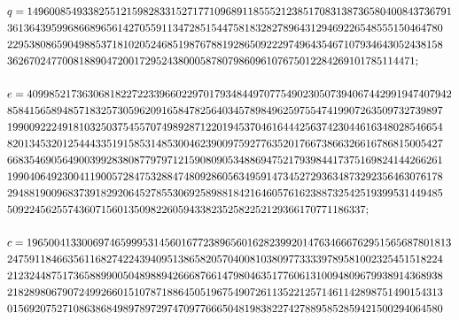 \documentclass{article}
\theoremstyle{break}
\begin{document}
\begin{enumerate}
\[\begin{aligned}
                        &q=14960085493382551215982833152717710968911855521238517083138736580400843736791\\
                        &3613643959968668965614270559113472851544758183282789643129469226548555150464780\\
                        &2295380865904988537181020524685198767881928650922297496435467107934643052438158\\
                        &36267024770081889047200172952438000587807986096107675012284269101785114471;\\
                        \leavevmode\\
                        &e=40998521736306818227223396602297017934844970775490230507394067442991947407942\\
                        &8584156589485718325730596209165847825640345789849625975547419907263509732739897\\
                        &1990092224918103250375455707498928712201945370461644425637423044616348028546654\\
                        &8201345320125444335191585314853004623900975927763520176673866326616786815005427\\
                        &6683546905649003992838087797971215908090534886947521793984417375169824144266261\\
                        &1990406492300411900572847532884748092860563495914734527293634873292356463076178\\
                        &2948819009683739182920645278553069258988184216460576162388732542519399531449485\\
                        &50922456255743607156013509822605943382352582252129366170771186337;\\
                        \leavevmode\\
                        &c=19650041330069746599953145601677238965601628239920147634666762951565687801813\\
                        &2475911846635611682742243940951386582057040081038097733339789581002325451518224\\
                        &2123244875173658899005048988942666876614798046351776061310094809679938914368938\\
                        &2182898067907249926601510787188645051967549072611352212571461142898751490154313\\
                        &0156920752710863868498978972974709776665048198382274278895852859421500294064580\\

\end{aligned}\]
\end{enumerate}
\end{document}
